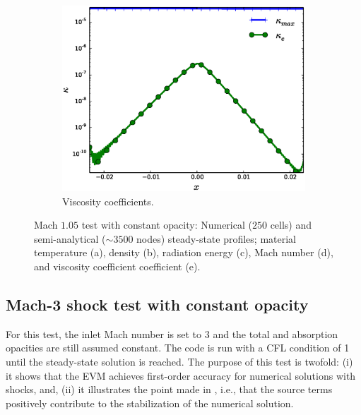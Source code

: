 \documentclass[times,doublespace]{fldauth}%
\begin{document}
\begin{figure}[h]
\begin{subfigure}{0.49\textwidth}
    \end{subfigure}        
    \begin{subfigure}{0.49\textwidth}
    \includegraphics[width=\linewidth]{figures/cst-xs/mach-1p05/mass-diff-mach-1p05-visc-nel-250-plot.eps}
    \caption{Viscosity coefficients.}\label{fig:mach-1p05-cst-xs-visc}
    \end{subfigure}        
\caption{Mach $1.05$ test with constant opacity: Numerical ($250$ cells) and semi-analytical ($\sim 3500$ nodes) steady-state profiles;
material temperature (a), density (b), radiation energy (c), Mach number (d), and viscosity coefficient coefficient (e).}\label{fig:mach-1p05-cst-xs}    
\end{figure}
\FloatBarrier
\newpage
\pagebreak
\newpage

\subsection{Mach-3 shock test with constant opacity}\label{sec:mach-3-cst-xs}
%
For this test, the inlet Mach number is set to $3$ and the total and absorption opacities are still assumed constant. 
The code is run with a CFL condition of 1 until the steady-state solution is reached. The purpose of this test is twofold: (i) it shows that the EVM achieves first-order accuracy for numerical solutions with shocks, and, (ii) it illustrates the point made in , i.e., that the source terms positively contribute to the stabilization of the numerical solution.
\end{document}
